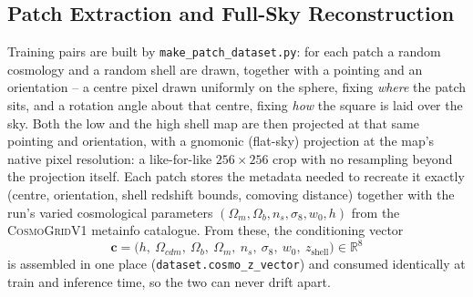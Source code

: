 \documentclass{report}
\begin{document}
\subsection{Patch Extraction and Full-Sky Reconstruction}
\label{subsec:pipe-patches}

Training pairs are built by \texttt{make\_patch\_dataset.py}: for each patch a random cosmology and a random shell are drawn, together with a pointing and an orientation -- a centre pixel drawn uniformly on the sphere, fixing \emph{where} the patch sits, and a rotation angle about that centre, fixing \emph{how} the square is laid over the sky. Both the low and the high shell map are then projected at that same pointing and orientation, with a gnomonic (flat-sky) projection at the map's native pixel resolution: a like-for-like \mbox{$256\times256$} crop with no resampling beyond the projection itself. Each patch stores the metadata needed to recreate it exactly (centre, orientation, shell redshift bounds, comoving distance) together with the run's varied cosmological parameters $(\Omega_m, \Omega_b, n_s, \sigma_8, w_0, h)$ from the \textsc{CosmoGridV1} metainfo catalogue. From these, the conditioning vector
\begin{equation}
  \mathbf{c} = \big(h,\ \Omega_{cdm},\ \Omega_b,\ \Omega_m,\ n_s,\ \sigma_8,\ w_0,\ z_{\mathrm{shell}}\big) \in \mathbb{R}^8
  \label{eq:cosmo_z}
\end{equation}
is assembled in one place (\texttt{dataset.cosmo\_z\_vector}) and consumed identically at train and inference time, so the two can never drift apart.
\end{document}
